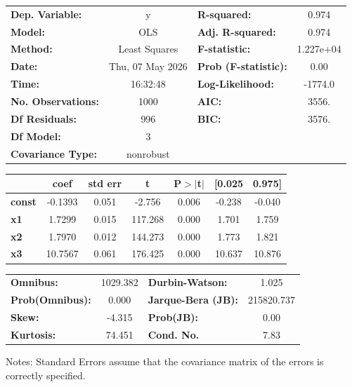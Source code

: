 \begin{center}
\begin{tabular}{lclc}
\toprule
\textbf{Dep. Variable:}    &        y         & \textbf{  R-squared:         } &     0.974   \\
\textbf{Model:}            &       OLS        & \textbf{  Adj. R-squared:    } &     0.974   \\
\textbf{Method:}           &  Least Squares   & \textbf{  F-statistic:       } & 1.227e+04   \\
\textbf{Date:}             & Thu, 07 May 2026 & \textbf{  Prob (F-statistic):} &     0.00    \\
\textbf{Time:}             &     16:32:48     & \textbf{  Log-Likelihood:    } &   -1774.0   \\
\textbf{No. Observations:} &        1000      & \textbf{  AIC:               } &     3556.   \\
\textbf{Df Residuals:}     &         996      & \textbf{  BIC:               } &     3576.   \\
\textbf{Df Model:}         &           3      & \textbf{                     } &             \\
\textbf{Covariance Type:}  &    nonrobust     & \textbf{                     } &             \\
\bottomrule
\end{tabular}
\begin{tabular}{lcccccc}
               & \textbf{coef} & \textbf{std err} & \textbf{t} & \textbf{P$> |$t$|$} & \textbf{[0.025} & \textbf{0.975]}  \\
\midrule
\textbf{const} &      -0.1393  &        0.051     &    -2.756  &         0.006        &       -0.238    &       -0.040     \\
\textbf{x1}    &       1.7299  &        0.015     &   117.268  &         0.000        &        1.701    &        1.759     \\
\textbf{x2}    &       1.7970  &        0.012     &   144.273  &         0.000        &        1.773    &        1.821     \\
\textbf{x3}    &      10.7567  &        0.061     &   176.425  &         0.000        &       10.637    &       10.876     \\
\bottomrule
\end{tabular}
\begin{tabular}{lclc}
\textbf{Omnibus:}       & 1029.382 & \textbf{  Durbin-Watson:     } &     1.025   \\
\textbf{Prob(Omnibus):} &   0.000  & \textbf{  Jarque-Bera (JB):  } & 215820.737  \\
\textbf{Skew:}          &  -4.315  & \textbf{  Prob(JB):          } &      0.00   \\
\textbf{Kurtosis:}      &  74.451  & \textbf{  Cond. No.          } &      7.83   \\
\bottomrule
\end{tabular}
\end{center}

Notes: \newline
 [1] Standard Errors assume that the covariance matrix of the errors is correctly specified.